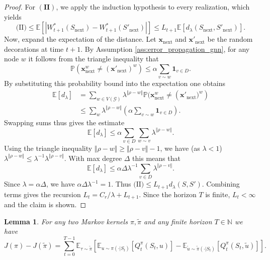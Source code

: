 \documentclass{article}
\newtheorem{lemma}{Lemma}
\begin{document}
\begin{proof}
For $\mathbf{(II)}$, we apply the induction hypothesis to every realization, which yields
\[
\text{(II)} \le \mathbb{E} \left[ |W_{t+1}^*(S_{\mathrm{next}}) - W_{t+1}^*(S'_{\mathrm{next}})| \right] \le L_{t+1} \mathbb{E} \left[ d_{\lambda}(S_{\mathrm{\mathrm{next}}}, S'_{\mathrm{next}}) \right].
\]
Now, expand the expectation of the distance. Let $\mathbf{x}_{\mathrm{next}}$ and $\mathbf{x}'_{\mathrm{next}}$ be the random decorations at time $t+1$. By Assumption \ref{ass:error_propagation_gnn}, for any node $w$ it follows from the triangle inequality that
\[
\mathbb{P}\left(\mathbf{x}_{\mathrm{next}}^w \neq (\mathbf{x}'_{\mathrm{next}})^w \right) \le \alpha \sum_{v \sim w} \mathbf{1}_{v \in D}.
\]
By substituting this probability bound into the expectation one obtains
\begin{align*}
    \mathbb{E}[d_{\lambda}] &= \sum_{w \in V(\mathcal G)} \lambda^{\Vert \rho - w \Vert} \mathbb{P}(\mathbf{x}_{\mathrm{next}}^w \neq \left(\mathbf{x}'_{\mathrm{next}})^w \right) \\
    &\le \sum_{w} \lambda^{\Vert \rho - w \Vert} \left( \alpha \sum_{v \sim w} \mathbf{1}_{v \in D} \right).
\end{align*}
Swapping sums thus gives the estimate
\[
\mathbb{E}[d_{\lambda}]\le \alpha \sum_{v \in D} \sum_{w \sim v} \lambda^{\Vert \rho - w \Vert}.
\]
Using the triangle inequality $\Vert \rho - w \Vert \ge \Vert \rho - v \Vert - 1$, we have (as $\lambda <1$) $\lambda^{\Vert \rho - w \Vert} \le \lambda^{-1} \lambda^{\Vert \rho - v \Vert}$. With max degree $\Delta$ this means that
\[
\mathbb{E}[d_{\lambda}]\le \alpha \Delta \lambda^{-1} \sum_{v \in D} \lambda^{\Vert \rho - v \Vert}.
\]
Since $\lambda = \alpha \Delta$, we have $\alpha \Delta \lambda^{-1} = 1$. Thus $\text{(II)} \le L_{t+1} d_{\lambda}(S, S')$.
Combining terms gives the recursion $L_t = C_r/\lambda + L_{t+1}$. Since the horizon $T$ is finite, $L_t < \infty$ and the claim is shown.
\end{proof}
\begin{lemma}
\label{lem:perf_diff}
    For any two Markov kernels $\pi, \tilde{\pi}$ and any finite horizon $T \in \mathbb N$ we have
    \[
    J(\pi) - J(\tilde{\pi}) = \sum_{t=0}^{T-1} \mathbb{E}_{\tau \sim \tilde{\pi}} \left[ \mathbb{E}_{u \sim \pi(\cdot|S_t)}[Q_t^\pi(S_t, u)] - \mathbb{E}_{\tilde{u} \sim \tilde{\pi}(\cdot|S_t)}[Q_t^\pi(S_t, \tilde{u})] \right].
    \]
\end{lemma}
\end{document}
